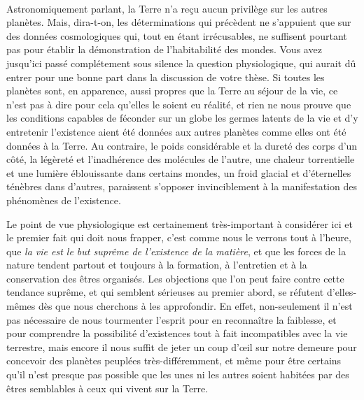 \documentclass[a4paper, 11pt, oneside]{article}
\begin{document}
\paragraph{}
Astronomiquement parlant, la Terre n'a reçu aucun privilège sur les autres planètes. Mais, dira-t-on, les déterminations qui précèdent ne s'appuient que sur des données cosmologiques qui, tout en étant irrécusables, ne suffisent pourtant pas pour établir la démonstration de l'habitabilité des mondes. Vous avez jusqu'ici passé complétement sous silence la question physiologique, qui aurait dû entrer pour une bonne part dans la discussion de votre thèse. Si toutes les planètes sont, en apparence, aussi propres que la Terre au séjour de la vie, ce n'est pas à dire pour cela qu'elles le soient eu réalité, et rien ne nous prouve que les conditions capables de féconder sur un globe les germes latents de la vie et d'y entretenir l'existence aient été données aux autres planètes comme elles ont été données à la Terre. Au contraire, le poids considérable et la dureté des corps d'un côté, la légèreté et l'inadhérence des molécules de l'autre, une chaleur torrentielle et une lumière éblouissante dans certains mondes, un froid glacial et d'éternelles ténèbres dans d'autres, paraissent s'opposer invinciblement à la manifestation des phénomènes de l'existence.

Le point de vue physiologique est certainement très-important à considérer ici et le premier fait qui doit nous frapper, c'est comme nous le verrons tout à l'heure, que \emph{la vie est le but suprême de l'existence de la matière}, et que les forces de la nature tendent partout et toujours à la formation, à l'entretien et à la conservation des êtres organisés. Les objections que l'on peut faire contre cette tendance suprême, et qui semblent sérieuses au premier abord, se réfutent d'elles-mêmes dès que nous cherchons à les approfondir. En effet, non-seulement il n'est pas nécessaire de nous tourmenter l'esprit pour en reconnaître la faiblesse, et pour comprendre la possibilité d'existences tout à fait incompatibles avec la vie terrestre, mais encore il nous suffit de jeter un coup d'œil sur notre demeure pour concevoir des planètes peuplées très-différemment, et même pour être certains qu'il n'est presque pas possible que les unes ni les autres soient habitées par des êtres semblables à ceux qui vivent sur la Terre.
\end{document}
